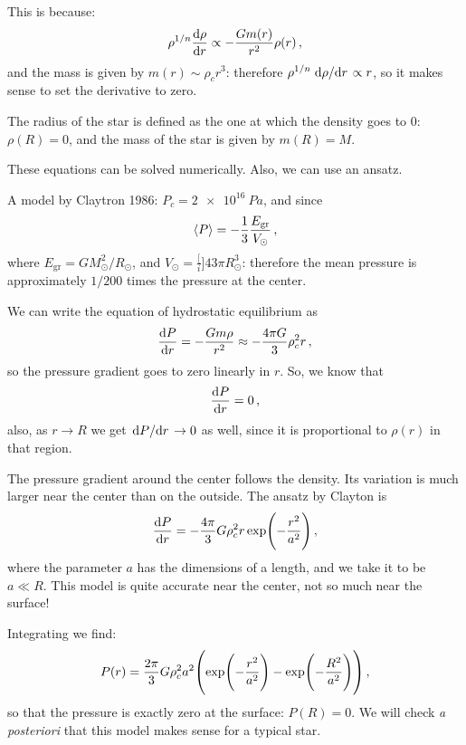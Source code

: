 \documentclass[main.tex]{subfiles}
\begin{document}
This is because: 
%
\begin{align}
  \rho^{1/n} \dv{\rho }{r} \propto - \frac{Gm(r)}{r^2} \rho (r)
\,,
\end{align}
%
and the mass is given by \(m(r) \sim \rho_c r^3\): therefore \(\rho^{1/n} \dv*{\rho }{r} \propto r\), so it makes sense to set the derivative to zero. 

The radius of the star is defined as the one at which the density goes to 0: \(\rho (R) =0\), and the mass of the star is given by \(m(R) = M\). 

These equations can be solved numerically. Also, we can use an ansatz. 

A model by Claytron 1986: \(P_c = \SI{2e16}{Pa}\), and since 
%
\begin{align}
  \expval{P} = - \frac{1}{3} \frac{E _{\text{gr}}}{V_{\odot}}
\,,
\end{align}
%
where \(E _{\text{gr}} = G M_{\odot}^2 / R_{\odot}\), and \(V_{\odot} = \frac[i]{4}{3} \pi R_{\odot}^3\): therefore the mean pressure is approximately \(1/200\) times the pressure at the center. 

We can write the equation of hydrostatic equilibrium as 
%
\begin{align}
  \dv{P}{r} = - \frac{Gm \rho }{r^2} \approx -\frac{4 \pi G}{3} \rho^2_c r 
\,,
\end{align}
%
so the pressure gradient goes to zero linearly in \(r\). 
So, we know that 
%
\begin{align}
  \dv{P}{r} (r=0) = 0
\,,
\end{align}
%
also, as \(r \rightarrow R\) we get \(\dv*{P}{r} \rightarrow 0\) as well, since it is proportional to \(\rho (r)\) in that region. 

The pressure gradient around the center follows the density. Its variation is much larger near the center than on the outside. 
The ansatz by Clayton is 
%
\begin{align}
  \dv{P}{r} = -\frac{4 \pi }{3} G \rho _c^2 r \exp(- \frac{r^2}{a^2})
\,,
\end{align}
%
where the parameter \(a\) has the dimensions of a length, and we take it to be \(a \ll R \). This model is quite accurate near the center, not so much near the surface! 

Integrating we find: 
%
\begin{align}
  P(r) = \frac{2 \pi }{3} G \rho_c^2 a^2 \qty(\exp(- \frac{r^2}{a^2}) - \exp(- \frac{R^2}{a^2}))
\,,
\end{align}
%
so that the pressure is exactly zero at the surface: \(P(R) = 0\).
We will check \emph{a posteriori} that this model makes sense for a typical star.
\end{document}
